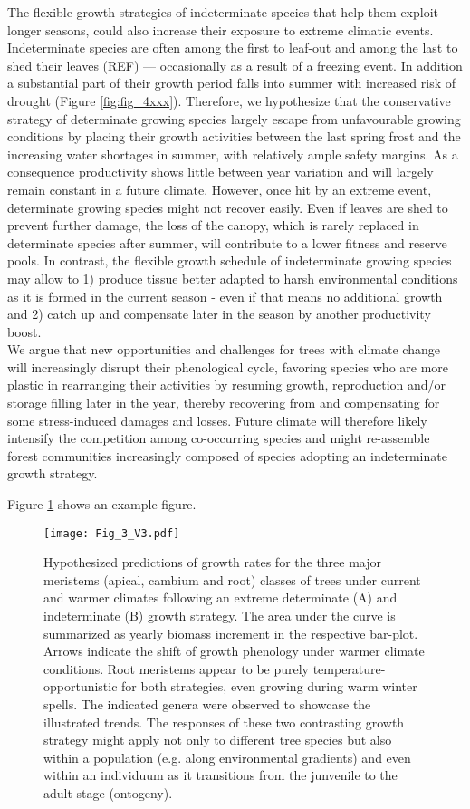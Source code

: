 \documentclass{article}
\begin{document}
The flexible growth strategies of indeterminate species that help them exploit longer seasons, could also increase their exposure to extreme climatic events. Indeterminate species are often among the first to leaf-out and among the last to shed their leaves (REF) --- occasionally as a result of a freezing event. In addition a substantial part of their growth period falls into summer with increased risk of drought (Figure \ref{fig:fig_4xxx}). Therefore, we hypothesize that the conservative strategy of determinate growing species largely escape from unfavourable growing conditions by placing their growth activities between the last spring frost and the increasing water shortages in summer, with relatively ample safety margins. As a consequence productivity shows little between year variation and will largely remain constant in a future climate. However, once hit by an extreme event, determinate growing species might not recover easily. Even if leaves are shed to prevent further damage, the loss of the canopy, which is rarely replaced in determinate species after summer, will contribute to a lower fitness and reserve pools. In contrast, the flexible growth schedule of indeterminate growing species may allow to 1) produce tissue better adapted to harsh environmental conditions as it is formed in the current season - even if that means no additional growth and 2) catch up and compensate later in the season by another productivity boost. \\

We argue that new opportunities and challenges for trees with climate change will increasingly disrupt their phenological cycle, favoring species who are more plastic in rearranging their activities by resuming growth, reproduction and/or storage filling later in the year, thereby recovering from and compensating for some stress-induced damages and losses. Future climate will therefore likely intensify the competition among co-occurring species and might re-assemble forest communities increasingly composed of species adopting an indeterminate growth strategy.

			Figure \ref{fig:fig_3xxx} shows an example figure.
	
								\begin{figure}
								\centering
								\texttt{[image: Fig\_3\_V3.pdf]} 
								\caption{Hypothesized predictions of growth rates for the three major meristems (apical, cambium and root) classes of trees under current and warmer climates following an extreme determinate (A) and indeterminate (B) growth strategy. The area under the curve is summarized as yearly biomass increment in the respective bar-plot. Arrows indicate the shift of growth phenology under warmer climate conditions. Root meristems appear to be purely temperature-opportunistic for both strategies, even growing during warm winter spells. The indicated genera were observed to showcase the illustrated trends. The responses of these two contrasting growth strategy might apply not only to different tree species but also within a population (e.g. along environmental gradients) and even within an individuum as it transitions from the junvenile to the adult stage (ontogeny).}
								\label{fig:fig_3xxx}
							\end{figure}
	
\end{document}
